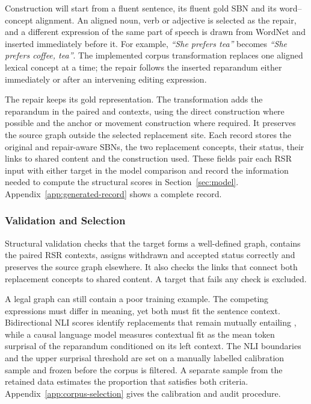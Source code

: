 \documentclass{article}
\begin{document}
Construction will start from a fluent sentence, its fluent gold SBN and its word--concept
alignment. An aligned noun, verb or adjective is selected as the repair, and a
different expression of the same part of speech is drawn from WordNet
\citep{millerWordNetLexicalDatabase1994} and inserted immediately before it.
For example, \textit{``She prefers tea''} becomes \textit{``She prefers
coffee, tea''}. The implemented corpus transformation replaces one aligned
lexical concept at a time; the repair follows the inserted reparandum either
immediately or after an intervening editing expression.

The repair keeps its gold representation. The transformation adds the
reparandum in the paired  and 
contexts, using the direct construction where possible and the anchor or
movement construction where required. It preserves the source graph
outside the selected replacement site. Each record stores the original and
repair-aware SBNs, the two replacement concepts, their status, their links to
shared content and the construction used. These fields pair each RSR input
with either target in the model comparison and record the information needed
to compute the structural scores in Section~\ref{sec:model}.
Appendix~\ref{app:generated-record}
shows a complete record.

\subsubsection{Validation and Selection}

Structural validation checks that the target forms a well-defined graph,
contains the paired RSR contexts, assigns withdrawn and accepted status
correctly and preserves the source graph elsewhere. It also checks the links
that connect both replacement concepts to shared content. A target that fails
any check is excluded.

A legal graph can still contain a poor training example. The competing
expressions must differ in meaning, yet both must fit the sentence context.
Bidirectional NLI scores identify replacements that remain mutually entailing
\citep{laurerLessAnnotatingMore2024}, while a causal language model measures
contextual fit as the mean token surprisal of the reparandum conditioned on
its left context. The NLI boundaries and the upper surprisal threshold are set
on a manually labelled calibration sample and frozen before the corpus is filtered. A separate sample
from the retained data estimates the proportion that satisfies both criteria.
Appendix~\ref{app:corpus-selection} gives the calibration and audit procedure.
\end{document}
